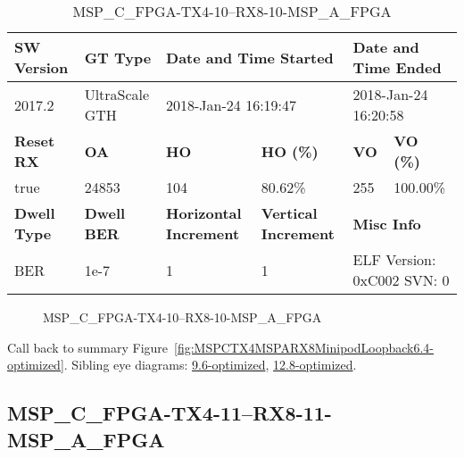 \begin{table}[h]
\centering
\caption{MSP\_C\_FPGA-TX4-10--RX8-10-MSP\_A\_FPGA}
\label{tab:MSPCFPGATX410RX810MSPAFPGA6.4-optimized}
\begin{tabular}{@{}|l|l|l|l|l|l|@{}}
\toprule
\textbf{SW Version}                & \textbf{GT Type}   & \multicolumn{2}{l|}{\textbf{Date and Time Started}}            & \multicolumn{2}{l|}{\textbf{Date and Time Ended}}        \\ \midrule
2017.2                       & UltraScale GTH          & \multicolumn{2}{l|}{2018-Jan-24 16:19:47}                   & \multicolumn{2}{l|}{2018-Jan-24 16:20:58}               \\ \midrule
\textbf{Reset RX}                  & \textbf{OA} & \textbf{HO}   & \textbf{HO (\%)} & \textbf{VO} & \textbf{VO (\%)} \\ \midrule
true & 24853        & 104          & 80.62\%        & 255        & 100.00\%       \\ \midrule
\textbf{Dwell Type}                & \textbf{Dwell BER} & \textbf{Horizontal Increment} & \textbf{Vertical Increment}    & \multicolumn{2}{l|}{\textbf{Misc Info}}                  \\ \midrule
BER                            & 1e-7        & 1        & 1           & \multicolumn{2}{l|}{ELF Version: 0xC002 SVN: 0}                         \\ \bottomrule
\end{tabular}
\end{table}

\begin{figure}[h]
\caption{MSP\_C\_FPGA-TX4-10--RX8-10-MSP\_A\_FPGA} \label{fig:MSPCFPGATX410RX810MSPAFPGA6.4-optimized}
\end{figure}

Call back to summary Figure~\ref{fig:MSPCTX4MSPARX8MinipodLoopback6.4-optimized}.
Sibling eye diagrams: \hyperref[sec:MSPCFPGATX410RX810MSPAFPGA9.6-optimized]{9.6-optimized}, \hyperref[sec:MSPCFPGATX410RX810MSPAFPGA12.8-optimized]{12.8-optimized}.

\clearpage
\newpage


\subsection{MSP\_C\_FPGA-TX4-11--RX8-11-MSP\_A\_FPGA}\label{sec:MSPCFPGATX411RX811MSPAFPGA6.4-optimized}

